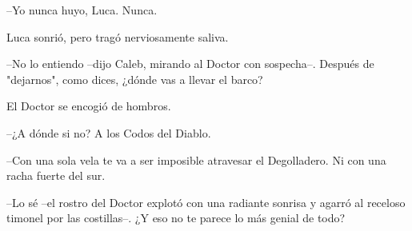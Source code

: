 --Yo nunca huyo, Luca. Nunca.
 
Luca sonrió, pero tragó nerviosamente saliva.
 
--No lo entiendo --dijo Caleb, mirando al Doctor con sospecha--. Después de "dejarnos", como dices, ¿dónde vas a llevar el barco?
 
El Doctor se encogió de hombros.
 
--¿A dónde si no? A los Codos del Diablo.
 
--Con una sola vela te va a ser imposible atravesar el Degolladero. Ni con una racha fuerte del sur.
 
--Lo sé --el rostro del Doctor explotó con una radiante sonrisa y agarró al receloso timonel por las costillas--. ¿Y eso no te parece lo más genial de todo?
